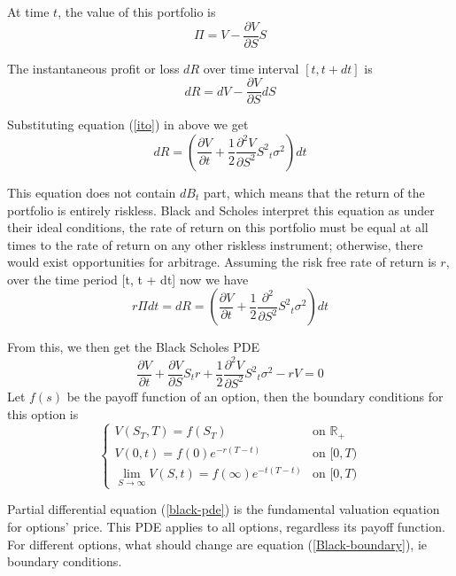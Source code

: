 \documentclass[12pt,oneside,titlepage]{book}
\def\bR{{\mathbb{R}}}
\begin{document}
At time $t$, the value of this portfolio is
\begin{equation}
\Pi = V - \frac{\partial V}{\partial S} S
\end{equation}

The instantaneous profit or loss  $dR$ over time interval $[t, t+dt]$ is
\begin{equation}
dR = dV - \frac{\partial V}{\partial S} dS
\end{equation}

Substituting equation (\ref{ito}) in above we get
\begin{equation}
dR= (\frac{\partial V}{\partial t} + \frac{1}{2}\frac{{\partial}^2 V }{\partial S^2} {S^2}_t {\sigma}^2 ) dt
\end{equation}

This equation does not contain $dB_t$ part, which means that the return of the portfolio is entirely riskless. Black and Scholes interpret this equation as under their ideal conditions, the rate of return on this portfolio must be equal at all times to the rate of return on any other riskless instrument; otherwise, there would exist opportunities for arbitrage. Assuming the risk free rate of return is $r$,  over the time period [t, t + dt] now we have
\begin{equation}
r \Pi dt = dR =  (\frac{\partial V}{\partial t} + \frac{1}{2}\frac{{\partial}^2}{\partial S^2} {S^2}_t {\sigma}^2 ) dt
\end{equation}

From this, we then get the Black Scholes PDE
\begin{equation}\label{black-pde}
\frac{\partial V}{\partial t} + \frac{\partial V }{\partial S} S_t r + \frac{1}{2} \frac{{\partial}^2 V}{\partial S^2} {S^2}_t {\sigma}^2 -rV=0
\end{equation}
Let $f(s)$ be the payoff function of an option, then the boundary conditions for this option is
\begin{equation}\label{Black-boundary}
\begin{cases}
V(S_T,T) =f(S_T)  & \text{on } \bR_+ \\
V(0,t)=f(0)e^{-r(T-t)} & \text{on } [0,T) \\
\displaystyle\lim_{S \to \infty} V(S,t)= f(\infty)e^{-t(T-t)} & \text{on } [0,T)
\end{cases}
\end{equation}

Partial differential equation (\ref{black-pde}) is the fundamental valuation equation for options' price. This PDE applies to all options, regardless its payoff function. For different options, what should change are equation (\ref{Black-boundary}), ie boundary conditions.
\end{document}
